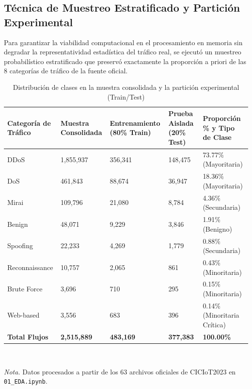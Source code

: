 \subsection{Técnica de Muestreo Estratificado y Partición Experimental}
Para garantizar la viabilidad computacional en el procesamiento en memoria sin degradar la representatividad estadística del tráfico real, se ejecutó un muestreo probabilístico estratificado que preservó exactamente la proporción a priori de las 8 categorías de tráfico de la fuente oficial.

\begin{table}[H]
\centering
\caption{Distribución de clases en la muestra consolidada y la partición experimental (Train/Test)}
\label{tab:distribucion_muestra_mm}
\small



\begin{tabularx}{\textwidth}{p{3.0cm} p{2.5cm} p{2.5cm} p{2.5cm} X}
\toprule
\textbf{Categoría de Tráfico} & \textbf{Muestra Consolidada} & \textbf{Entrenamiento (80\% Train)} & \textbf{Prueba Aislada (20\% Test)} & \textbf{Proporción \% y Tipo de Clase} \\
\midrule
DDoS & 1,855,937 & 356,341 & 148,475 & 73.77\% (Mayoritaria) \\
DoS & 461,843 & 88,674 & 36,947 & 18.36\% (Mayoritaria) \\
Mirai & 109,796 & 21,080 & 8,784 & 4.36\% (Secundaria) \\
Benign & 48,071 & 9,229 & 3,846 & 1.91\% (Benigno) \\
Spoofing & 22,233 & 4,269 & 1,779 & 0.88\% (Secundaria) \\
Reconnaissance & 10,757 & 2,065 & 861 & 0.43\% (Minoritaria) \\
Brute Force & 3,696 & 710 & 295 & 0.15\% (Minoritaria) \\
Web-based & 3,556 & 683 & 396 & 0.14\% (Minoritaria Crítica) \\
\midrule
\textbf{Total Flujos} & \textbf{2,515,889} & \textbf{483,169} & \textbf{377,383} & \textbf{100.00\%} \\
\bottomrule
\end{tabularx}
\\[5pt]
\begin{minipage}{\textwidth}
\small \textit{Nota.} Datos procesados a partir de los 63 archivos oficiales de CICIoT2023 en \texttt{01\_EDA.ipynb}.
\end{minipage}
\end{table}

